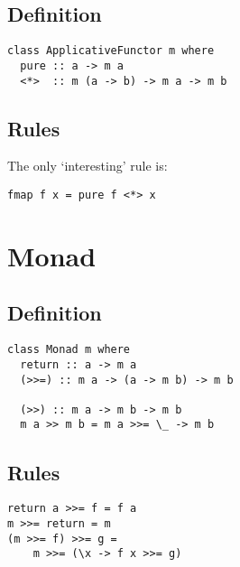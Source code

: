 \documentclass[12pt, twocolumn]{article}
\begin{document}
\subsection*{Definition}
\begin{verbatim}
class ApplicativeFunctor m where
  pure :: a -> m a
  <*>  :: m (a -> b) -> m a -> m b
\end{verbatim}

\subsection*{Rules}
The only `interesting' rule is:
\begin{verbatim}
fmap f x = pure f <*> x
\end{verbatim}

\section*{Monad}

\subsection*{Definition}
\begin{verbatim}
class Monad m where
  return :: a -> m a
  (>>=) :: m a -> (a -> m b) -> m b

  (>>) :: m a -> m b -> m b
  m a >> m b = m a >>= \_ -> m b
\end{verbatim}

\subsection*{Rules}
\begin{verbatim}
return a >>= f = f a
m >>= return = m
(m >>= f) >>= g = 
    m >>= (\x -> f x >>= g)
\end{verbatim}
\end{document}
